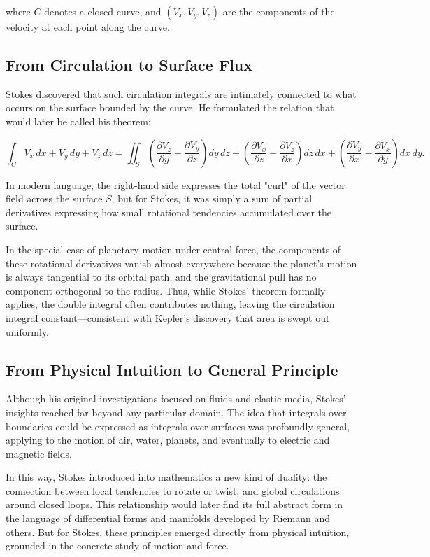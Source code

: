 where \(C\) denotes a closed curve, and \((V_x, V_y, V_z)\) are the components of the velocity at each point along the curve.

\subsection{From Circulation to Surface Flux}

Stokes discovered that such circulation integrals are intimately connected to what occurs on the surface bounded by the curve. He formulated the relation that would later be called his theorem:

\[
\int_{C} V_x\, dx + V_y\, dy + V_z\, dz = \iint_{S} \left( \frac{\partial V_z}{\partial y} - \frac{\partial V_y}{\partial z} \right) dy\, dz + \left( \frac{\partial V_x}{\partial z} - \frac{\partial V_z}{\partial x} \right) dz\, dx + \left( \frac{\partial V_y}{\partial x} - \frac{\partial V_x}{\partial y} \right) dx\, dy.
\]

In modern language, the right-hand side expresses the total "curl" of the vector field across the surface \(S\), but for Stokes, it was simply a sum of partial derivatives expressing how small rotational tendencies accumulated over the surface.

In the special case of planetary motion under central force, the components of these rotational derivatives vanish almost everywhere because the planet’s motion is always tangential to its orbital path, and the gravitational pull has no component orthogonal to the radius. Thus, while Stokes' theorem formally applies, the double integral often contributes nothing, leaving the circulation integral constant—consistent with Kepler’s discovery that area is swept out uniformly.

\subsection{From Physical Intuition to General Principle}

Although his original investigations focused on fluids and elastic media, Stokes' insights reached far beyond any particular domain. The idea that integrals over boundaries could be expressed as integrals over surfaces was profoundly general, applying to the motion of air, water, planets, and eventually to electric and magnetic fields.

In this way, Stokes introduced into mathematics a new kind of duality: the connection between local tendencies to rotate or twist, and global circulations around closed loops. This relationship would later find its full abstract form in the language of differential forms and manifolds developed by Riemann and others. But for Stokes, these principles emerged directly from physical intuition, grounded in the concrete study of motion and force.


